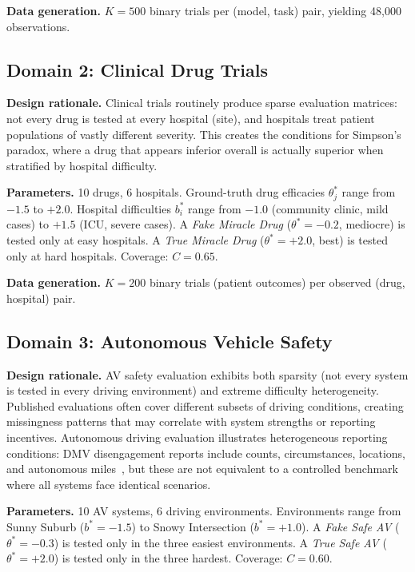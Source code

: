 \documentclass[11pt,a4paper]{article}
\begin{document}
\textbf{Data generation.} $K = 500$ binary trials per (model, task) pair, yielding 48,000 observations.

\subsection{Domain 2: Clinical Drug Trials}

\textbf{Design rationale.} Clinical trials routinely produce sparse evaluation matrices: not every drug is tested at every hospital (site), and hospitals treat patient populations of vastly different severity. This creates the conditions for Simpson's paradox, where a drug that appears inferior overall is actually superior when stratified by hospital difficulty.

\textbf{Parameters.} 10 drugs, 6 hospitals. Ground-truth drug efficacies $\theta^*_j$ range from $-1.5$ to $+2.0$. Hospital difficulties $b^*_i$ range from $-1.0$ (community clinic, mild cases) to $+1.5$ (ICU, severe cases). A \emph{Fake Miracle Drug} ($\theta^* = -0.2$, mediocre) is tested only at easy hospitals. A \emph{True Miracle Drug} ($\theta^* = +2.0$, best) is tested only at hard hospitals. Coverage: $C = 0.65$.

\textbf{Data generation.} $K = 200$ binary trials (patient outcomes) per observed (drug, hospital) pair.

\subsection{Domain 3: Autonomous Vehicle Safety}

\textbf{Design rationale.} AV safety evaluation exhibits both sparsity (not every system is tested in every driving environment) and extreme difficulty heterogeneity. Published evaluations often cover different subsets of driving conditions, creating missingness patterns that may correlate with system strengths or reporting incentives. Autonomous driving evaluation illustrates heterogeneous reporting conditions: DMV disengagement reports include counts, circumstances, locations, and autonomous miles~\cite{cadmv2023}, but these are not equivalent to a controlled benchmark where all systems face identical scenarios.

\textbf{Parameters.} 10 AV systems, 6 driving environments. Environments range from Sunny Suburb ($b^* = -1.5$) to Snowy Intersection ($b^* = +1.0$). A \emph{Fake Safe AV} ($\theta^* = -0.3$) is tested only in the three easiest environments. A \emph{True Safe AV} ($\theta^* = +2.0$) is tested only in the three hardest. Coverage: $C = 0.60$.
\end{document}

